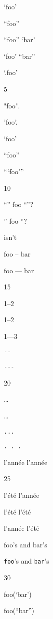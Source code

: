 
\def\mytitle{Smart Quotes}


`foo'

``foo''

``foo'' `bar'

`foo' ``bar''

`.foo'

5

"foo".

'foo'.

`foo'

``foo''

```foo'''

10

``'' foo ``''?

'' foo ''?

isn't

foo -- bar

foo --- bar

15

1--2

1--2

1---3

\texttt{-{}-}

\texttt{-{}-{}-}

20

{\ldots}

{\ldots}

\texttt{...}

\texttt{. . .}

l'année l'année

25

l'été l'année

l'été l'été

l'année l'été

foo's and bar's

\texttt{foo}'s and \texttt{bar}'s

30

foo(`bar')

foo(``bar'')



